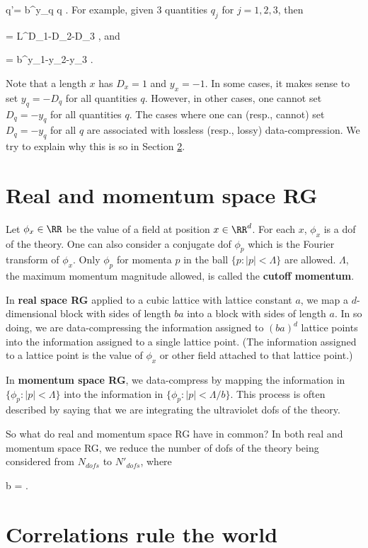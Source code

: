 \beq
q'= b^{y_q} q
\;.
\label{eq-def-fractal}
\eeq
For example,
given 3 quantities $q_j$ for $j=1,2,3$, then

\beq
{}=
L^{D_1-D_2-D_3}
\;,
\eeq
and

\beq
{}
= b^{y_1-y_2-y_3}
\;.
\eeq

Note that a length $x$ has
$D_x=1$ and $y_x=-1$.
In some cases, it makes sense
to set $y_q=-D_q$ for all quantities $q$.
However, in other
cases, one cannot set $D_q=-y_q$
for all quantities $q$. The cases where one
can (resp., cannot) set $D_q=-y_q$
for all $q$ are associated with lossless (resp., lossy)
data-compression. We try to explain
why this is so in Section \ref{sec-corr}.

\section{Real and momentum space RG}
Let $\phi_x\in \RR$
be the value of a field
at position $x\in \RR^d$. For
each $x$, $\phi_x$ is a dof of the
theory. One can also consider
a conjugate dof $\phi_p$
which is the Fourier transform of $\phi_x$.
Only $\phi_p$
for  momenta $p$
in
the ball $\{p: |p|<\Lambda\}$
are allowed.
$\Lambda$,
the maximum momentum magnitude allowed,
 is called the {\bf cutoff
momentum}.


In {\bf real space RG}
applied to a cubic lattice with
lattice constant $a$,
we map
a $d$-dimensional block with sides of length $b a$
into a  block with sides of length $a$.
In so doing, we are
data-compressing the information
assigned to $(b a)^d$ lattice points
into the information assigned to a
single lattice point.
(The information assigned
to a lattice point is the value
of $\phi_x$ or other field
attached to that lattice point.)


In {\bf momentum space RG},
we data-compress by mapping the
information in $\{\phi_p: |p|<\Lambda\}$
into the information in
$\{\phi_p: |p|<\Lambda/b\}$.
This process is often described
by saying that we are
integrating the ultraviolet dofs of the theory.

So what do real and momentum space RG
have in common?
In both real and momentum space RG,
we reduce the number of dofs
 of the theory being considered
from $N_{dofs}$ to $N'_{dofs}$, where

\beq
b = 
\;.
\eeq


\section{Correlations rule the world}
\label{sec-corr}

